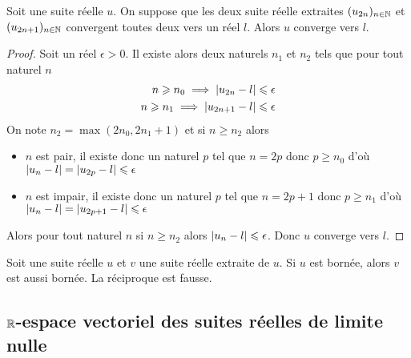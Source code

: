 \begin{prop}
  Soit une suite réelle \(u\). On suppose que les deux suite réelle extraites \((u_{2n})_{n \in \mathbb{N}}\) et \((u_{2n+1})_{n \in \mathbb{N}}\) convergent toutes deux vers un réel \(l\). Alors \(u\) converge vers \(l\).
\end{prop}
\begin{proof}
  Soit un réel \(\epsilon>0\). Il existe alors deux naturels \(n_1\) et \(n_2\) tels que pour tout naturel \(n\)
  \begin{align}
    n \geqslant n_0 \implies \left\lvert u_{2n}-l\right\rvert \leqslant \epsilon \\  n \geqslant n_1 \implies \left\lvert u_{2n+1}-l\right\rvert \leqslant \epsilon
  \end{align}
  On note \(n_2 = \max(2n_0,2n_1+1)\) et si \(n \geqslant n_2\) alors
  \begin{itemize}
  \item \(n\) est pair, il existe donc un naturel \(p\) tel que \(n = 2p\) donc \(p\geqslant n_0\) d'où \(\left\lvert u_n-l\right\rvert = \left\lvert u_{2p}-l\right\rvert \leqslant \epsilon\)
  \item \(n\) est impair, il existe donc un naturel \(p\) tel que \(n = 2p+1\) donc \(p\geqslant n_1\) d'où \(\left\lvert u_n-l\right\rvert = \left\lvert u_{2p+1}-l\right\rvert \leqslant \epsilon\)
  \end{itemize}
  Alors pour tout naturel \(n\) si \(n \geqslant n_2\) alors \(\left\lvert u_n-l\right\rvert \leqslant \epsilon\). Donc \(u\) converge vers \(l\).
\end{proof}
\begin{prop}
  Soit une suite réelle \(u\) et \(v\) une suite réelle extraite de \(u\). Si \(u\) est bornée, alors \(v\) est aussi bornée. La réciproque est fausse.
\end{prop}

\subsection{\(\mathbb{R}\)-espace vectoriel des suites réelles de limite nulle}

